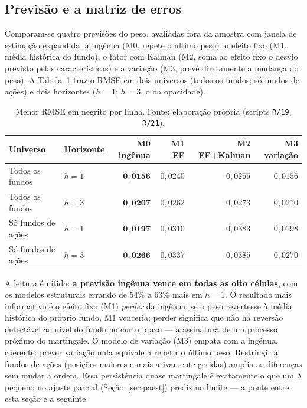 \documentclass[12pt,a4paper]{article}
\begin{document}
\subsection{Previsão e a matriz de erros}

Comparam-se quatro previsões do peso, avaliadas fora da amostra com janela de estimação
expandida: a ingênua (M0, repete o último peso), o efeito fixo (M1, média histórica do fundo), o
fator com Kalman (M2, soma ao efeito fixo o desvio previsto pelas características) e a variação
(M3, prevê diretamente a mudança do peso). A Tabela~\ref{tab:fc} traz o RMSE em dois universos
(todos os fundos; só fundos de ações) e dois horizontes ($h=1$; $h=3$, o da opacidade).

\begin{table}[h]\centering\small
\caption{Erro de previsão fora da amostra (RMSE), por universo, horizonte e modelo.}
\label{tab:fc}
\begin{tabular}{@{}llrrrr@{}}
\toprule
Universo & Horizonte & M0 ingênua & M1 EF & M2 EF+Kalman & M3 variação \\
\midrule
Todos os fundos    & $h=1$ & $\mathbf{0{,}0156}$ & $0{,}0240$ & $0{,}0255$ & $0{,}0156$ \\
Todos os fundos    & $h=3$ & $\mathbf{0{,}0207}$ & $0{,}0262$ & $0{,}0273$ & $0{,}0210$ \\
Só fundos de ações & $h=1$ & $\mathbf{0{,}0197}$ & $0{,}0310$ & $0{,}0383$ & $0{,}0198$ \\
Só fundos de ações & $h=3$ & $\mathbf{0{,}0266}$ & $0{,}0337$ & $0{,}0385$ & $0{,}0270$ \\
\bottomrule
\end{tabular}
\caption*{\footnotesize Menor RMSE em negrito por linha. Fonte: elaboração própria (scripts
\texttt{R/19}, \texttt{R/21}).}
\end{table}

A leitura é nítida: \textbf{a previsão ingênua vence em todas as oito células}, com os modelos
estruturais errando de 54\% a 63\% mais em $h=1$. O resultado mais informativo é o efeito fixo
(M1) \emph{perder} da ingênua: se o peso revertesse à média histórica do próprio fundo, M1
venceria; perder significa que não há reversão detectável ao nível do fundo no curto prazo --- a
assinatura de um processo próximo do martingale. O modelo de variação (M3) empata com a ingênua,
coerente: prever variação nula equivale a repetir o último peso. Restringir a fundos de ações
(posições maiores e mais ativamente geridas) amplia as diferenças sem mudar a ordem. Essa
persistência quase martingale é exatamente o que um $\lambda$ pequeno no ajuste parcial
(Seção~\ref{sec:paest}) prediz no limite --- a ponte entre esta seção e a seguinte.
\end{document}
